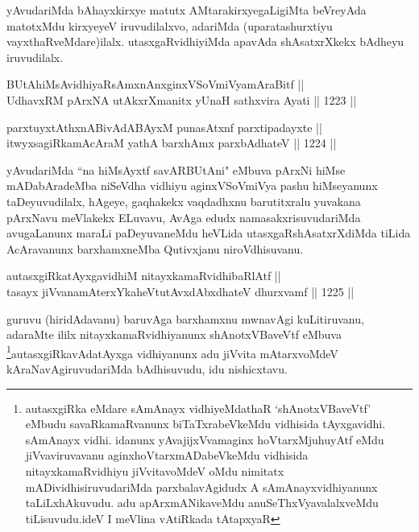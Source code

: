 \begin{artha}
yAvudariMda bAhayxkirxye matutx AMtarakirxyegaLigiMta beVreyAda matotxMdu kirxyeyeV iruvudilalxvo, adariMda (uparatashurxtiyu vayxthaRveMdare)ilalx. utasxgaRvidhiyiMda apavAda shAsatxrXkekx bAdheyu iruvudilalx.
\end{artha}


\begin{shl}
BUtAhiMsAvidhiyaRsAmxnAnxginxVSoVmiVyamAraBitf || \\
UdhavxRM pArxNA utAkxrXmanitx yUnaH sathxvira Ayati \hfill || 1223 ||  
\end{shl}

\begin{shl}
parxtuyxtAthxnABivAdABAyxM punasAtxnf parxtipadayxte || \\
itwyxsagiRkamAcAraM yathA barxhAmx parxbAdhateV \hfill || 1224 ||  
\end{shl}

\begin{artha}
yAvudariMda ``na hiMsAyxtf savARBUtAni" eMbuva pArxNi hiMse mADabAradeMba niSeVdha vidhiyu aginxVSoVmiVya pashu hiMseyanunx taDeyuvudilalx, hAgeye, gaqhakekx vaqdadhxnu barutitxralu yuvakana pArxNavu meVlakekx ELuvavu, AvAga edudx namasakxrisuvudariMda avugaLanunx maraLi paDeyuvaneMdu heVLida utasxgaRshAsatxrXdiMda tiLida AcAravanunx barxhamxneMba Qutivxjanu niroVdhisuvanu.
\end{artha}


\begin{shl}
autasxgiRkatAyxgavidhiM nitayxkamaRvidhibaRlAtf || \\
tasayx jiVvanamAterxYkaheVtutAvxdAbxdhateV dhurxvamf \hfill || 1225 ||  
\end{shl}

\begin{artha}
guruvu (hiridAdavanu) baruvAga barxhamxnu mwnavAgi kuLitiruvanu, adaraMte ililx nitayxkamaRvidhiyanunx shAnotxVBaveVtf eMbuva \footnote{autasxgiRka eMdare sAmAnayx vidhiyeMdathaR `shAnotxVBaveVtf' eMbudu savaRkamaRvanunx biTaTxrabeVkeMdu vidhisida tAyxgavidhi. sAmAnayx vidhi. idanunx yAvajijxVvamaginx hoVtarxMjuhuyAtf eMdu jiVvaviruvavanu aginxhoVtarxmADabeVkeMdu vidhisida nitayxkamaRvidhiyu jiVvitavoMdeV oMdu nimitatx mADividhisiruvudariMda parxbalavAgidudx A sAmAnayxvidhiyanunx taLiLxhAkuvudu. adu apArxmANikaveMdu anuSeThxVyavalalxveMdu tiLisuvudu.ideV I meVlina vAtiRkada tAtapxyaR}autasxgiRkavAdatAyxga vidhiyanunx adu jiVvita mAtarxvoMdeV kAraNavAgiruvudariMda bAdhisuvudu, idu nishicxtavu.
\end{artha}

